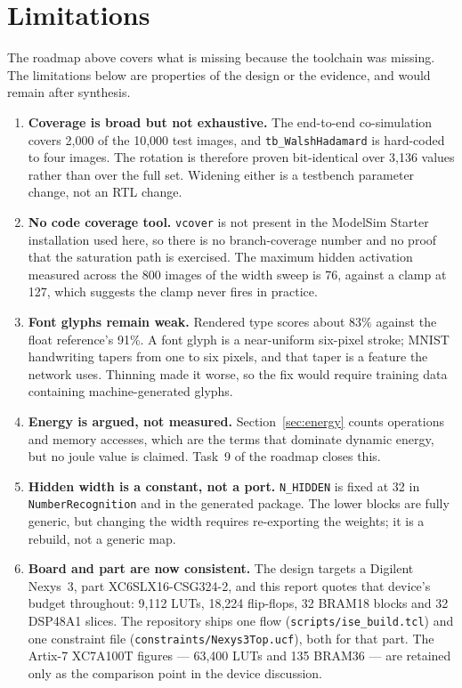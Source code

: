 \documentclass[11pt,a4paper]{article}
\begin{document}
\section{Limitations}
\label{sec:limitations}

The roadmap above covers what is missing because the toolchain was missing. The
limitations below are properties of the design or the evidence, and would remain
after synthesis.

\begin{enumerate}[leftmargin=*]
  \item \textbf{Coverage is broad but not exhaustive.} The end-to-end
      co-simulation covers 2{,}000 of the 10{,}000 test images, and
      \texttt{tb\_WalshHadamard} is hard-coded to four images. The rotation is
      therefore proven bit-identical over 3{,}136 values rather than over the
      full set. Widening either is a testbench parameter change, not an RTL
      change.
  \item \textbf{No code coverage tool.} \texttt{vcover} is not present in the
      ModelSim Starter installation used here, so there is no branch-coverage
      number and no proof that the saturation path is exercised. The maximum
      hidden activation measured across the 800 images of the width sweep is 76,
      against a clamp at 127, which suggests the clamp never fires in practice.
  \item \textbf{Font glyphs remain weak.} Rendered type scores about 83\%
      against the float reference's 91\%. A font glyph is a near-uniform
      six-pixel stroke; MNIST handwriting tapers from one to six pixels, and
      that taper is a feature the network uses. Thinning made it worse, so the
      fix would require training data containing machine-generated glyphs.
  \item \textbf{Energy is argued, not measured.} Section~\ref{sec:energy} counts
      operations and memory accesses, which are the terms that dominate dynamic
      energy, but no joule value is claimed. Task~9 of the roadmap closes this.
  \item \textbf{Hidden width is a constant, not a port.} \texttt{N\_HIDDEN} is
      fixed at 32 in \texttt{NumberRecognition} and in the generated package.
      The lower blocks are fully generic, but changing the width requires
      re-exporting the weights; it is a rebuild, not a generic map.
  \item \textbf{Board and part are now consistent.} The design targets a
      Digilent Nexys~3, part XC6SLX16-CSG324-2, and this report quotes that
      device's budget throughout: 9{,}112 LUTs, 18{,}224 flip-flops, 32 BRAM18
      blocks and 32 DSP48A1 slices. The repository ships one flow
      (\texttt{scripts/ise\_build.tcl}) and one constraint file
      (\texttt{constraints/Nexys3Top.ucf}), both for that part. The Artix-7
      XC7A100T figures --- 63{,}400 LUTs and 135 BRAM36 --- are retained only
      as the comparison point in the device discussion.
\end{enumerate}
\end{document}
